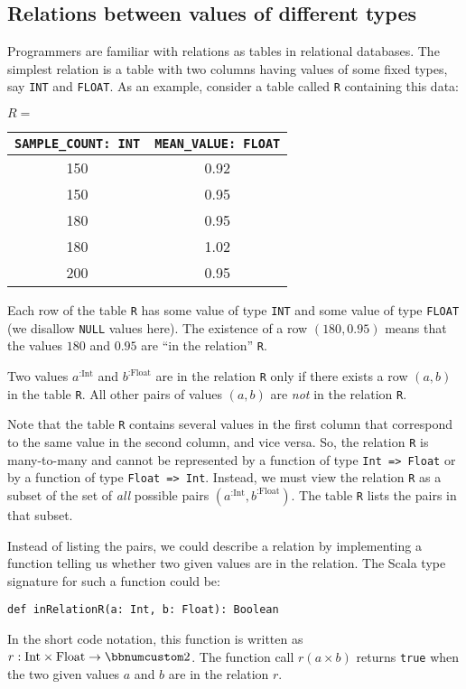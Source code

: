 \subsection{Relations between values of different types}

Programmers are familiar with relations as tables in relational databases.
The simplest relation is a table with two columns having values of
some fixed types, say \lstinline!INT! and \lstinline!FLOAT!. As
an example, consider a table called \lstinline!R! containing this
data:
\begin{center}
$R=$ %
\begin{tabular}{|c|c|}
\hline 
\lstinline!SAMPLE_COUNT: INT! & \lstinline!MEAN_VALUE: FLOAT!\tabularnewline
\hline 
\hline 
{\footnotesize{}150} & {\footnotesize{}0.92}\tabularnewline
\hline 
{\footnotesize{}150} & {\footnotesize{}0.95}\tabularnewline
\hline 
{\footnotesize{}180} & {\footnotesize{}0.95}\tabularnewline
\hline 
{\footnotesize{}180} & {\footnotesize{}1.02}\tabularnewline
\hline 
{\footnotesize{}200} & {\footnotesize{}0.95}\tabularnewline
\hline 
\end{tabular}
\par\end{center}

Each row of the table \lstinline!R! has some value of type \lstinline!INT!
and some value of type \lstinline!FLOAT! (we disallow \lstinline!NULL!
values here). The existence of a row $\left(180,0.95\right)$ means
that the values $180$ and $0.95$ are \textsf{``}in the relation\textsf{''} \lstinline!R!.

Two values $a^{:\text{Int}}$ and $b^{:\text{Float}}$ are in the
relation \lstinline!R! only if there exists a row $\left(a,b\right)$
in the table \lstinline!R!. All other pairs of values $\left(a,b\right)$
are \emph{not} in the relation \lstinline!R!. 

Note that the table \lstinline!R! contains several values in the
first column that correspond to the same value in the second column,
and vice versa. So, the relation \lstinline!R! is many-to-many and
cannot be represented by a function of type \lstinline!Int => Float!
or by a function of type \lstinline!Float => Int!. Instead, we must
view the relation \lstinline!R! as a subset of the set of \emph{all}
possible pairs $(a^{:\text{Int}},b^{:\text{Float}})$. The table \lstinline!R!
lists the pairs in that subset.

Instead of listing the pairs, we could describe a relation by implementing
a function telling us whether two given values are in the relation.
The Scala type signature for such a function could be:
\begin{lstlisting}
def inRelationR(a: Int, b: Float): Boolean
\end{lstlisting}
In the short code notation, this function is written as $r:\text{Int}\times\text{Float}\rightarrow\bbnum 2$.
The function call $r\left(a\times b\right)$ returns \lstinline!true!
when the two given values $a$ and $b$ are in the relation $r$.

